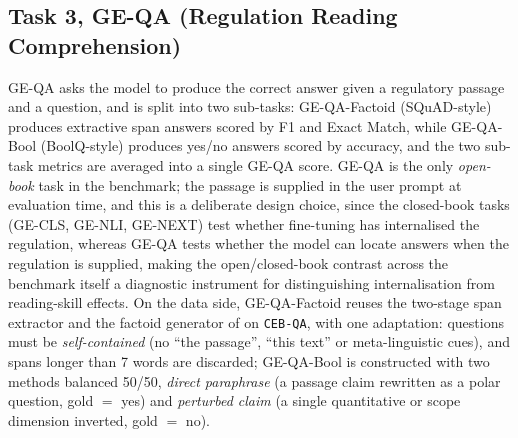 \documentclass[pdflatex, sn-apa]{sn-jnl}%
\theoremstyle{thmstyleone}%
\theoremstyle{thmstyletwo}%
\theoremstyle{thmstylethree}%
\begin{document}
\subsection{Task 3, GE-QA (Regulation Reading Comprehension)}
\label{sec:bench:qa}
GE-QA asks the model to produce the correct answer given a regulatory passage and
a question, and is split into two sub-tasks: GE-QA-Factoid (SQuAD-style) produces
extractive span answers scored by F1 and Exact Match, while GE-QA-Bool
(BoolQ-style) produces yes/no answers scored by accuracy, and the two sub-task
metrics are averaged into a single GE-QA score. GE-QA is the only
\emph{open-book} task in the benchmark; the passage is supplied in the user
prompt at evaluation time, and this is a deliberate design choice, since the
closed-book tasks (GE-CLS, GE-NLI, GE-NEXT) test whether fine-tuning has
internalised the regulation, whereas GE-QA tests whether the model can locate
answers when the regulation is supplied, making the open/closed-book contrast
across the benchmark itself a diagnostic instrument for distinguishing
internalisation from reading-skill effects. On the data side, GE-QA-Factoid
reuses the two-stage span extractor and the factoid generator of
 on \texttt{CEB-QA}, with one adaptation:
questions must be \emph{self-contained} (no ``the passage'', ``this text'' or
meta-linguistic cues), and spans longer than 7 words are discarded; GE-QA-Bool is
constructed with two methods balanced 50/50, \emph{direct paraphrase} (a passage
claim rewritten as a polar question, gold $=$ yes) and \emph{perturbed claim} (a
single quantitative or scope dimension inverted, gold $=$ no).



\end{document}
